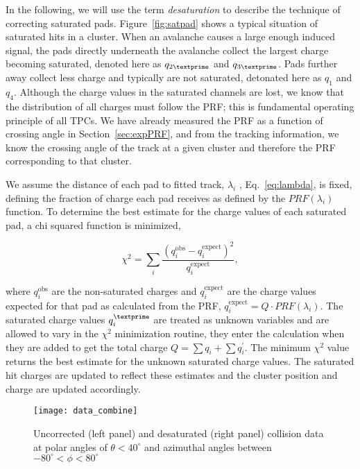 In the following, we will use the term \emph{desaturation} to describe the technique of correcting saturated pads. Figure~\ref{fig:satpad} shows a typical situation of saturated hits in a cluster. When an avalanche causes a large enough induced signal, the pads directly underneath the avalanche collect the largest charge becoming saturated, denoted here as $q_{2\textprime}$ and $q_{3\textprime}$. Pads further away collect less charge and typically are not saturated, detonated here as $q_{1}$ and $q_{4}$. Although the charge values in the saturated channels are lost, we know that the distribution of all charges must follow the PRF; this is fundamental operating principle of all TPCs. We have already measured the PRF as a function of crossing angle in Section~\ref{sec:expPRF}, and from the tracking information, we know the crossing angle of the track at a given cluster and therefore the PRF corresponding to that cluster. 

We assume the distance of each pad to fitted track, $\lambda_i$ , Eq.~\ref{eq:lambda}, is fixed, defining the fraction of charge each pad receives as defined by the $PRF(\lambda_i)$ function. To determine the best estimate for the charge values of each saturated pad, a chi squared function is minimized,

\begin{equation}\label{eq:chi}
\chi^2 = \sum_i \frac{(q_i^{\mathrm{obs}} - q_i^{\mathrm{expect}})^2}{q_i^{\mathrm{expect}}},
\end{equation}


where $q_i^{\mathrm{obs}}$ are the non-saturated charges and $q_i^{\mathrm{expect}}$ are the charge values expected for that pad as calculated from the PRF, $q_i^{\mathrm{expect}} = Q\cdot PRF(\lambda_i)$. The saturated charge values $q_{i}^{\textprime}$ are treated as unknown variables and are allowed to vary in the $\chi^2$ minimization routine, they enter the calculation when they are added to get the total charge $Q = \sum q_i + \sum q_i^{'}$. The minimum $\chi^2$ value returns the best estimate for the unknown saturated charge values. The saturated hit charges are updated to reflect these estimates and the cluster position and charge are updated accordingly.


\begin{figure*}[!htb]
\centering
\texttt{[image: data\_combine]}
\caption{Uncorrected (left panel) and desaturated (right panel) collision data at polar angles of $\theta < 40^{\circ}$ and azimuthal angles between $-80^{\circ} < \phi < 80^{\circ}$}
\label{fig:data_combine}
\end{figure*}


